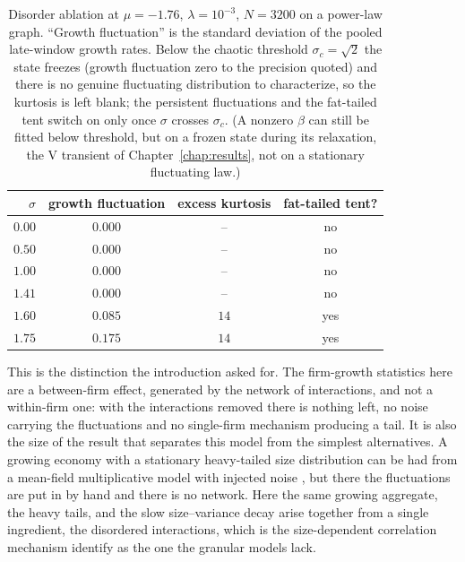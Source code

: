 \begin{table}[h]
    \centering
    \begin{tabular}{rccc}
        \hline
        $\sigma$ & growth fluctuation & excess kurtosis & fat-tailed tent? \\
        \hline
        $0.00$ & $0.000$ & --   & no  \\
        $0.50$ & $0.000$ & --   & no  \\
        $1.00$ & $0.000$ & --   & no  \\
        $1.41$ & $0.000$ & --   & no  \\
        $1.60$ & $0.085$ & $14$ & yes \\
        $1.75$ & $0.175$ & $14$ & yes \\
        \hline
    \end{tabular}
    \caption{Disorder ablation at $\mu = -1.76$, $\lambda = 10^{-3}$, $N = 3200$ on a
    power-law graph. ``Growth fluctuation'' is the standard deviation of the pooled
    late-window growth rates. Below the chaotic threshold $\sigma_c = \sqrt{2}$ the state
    freezes (growth fluctuation zero to the precision quoted) and there is no genuine
    fluctuating distribution to characterize, so the kurtosis is left blank; the
    persistent fluctuations and the fat-tailed tent switch on only once $\sigma$ crosses
    $\sigma_c$. (A nonzero $\beta$ can still be fitted below threshold, but on a frozen
    state during its relaxation, the V transient of Chapter~\ref{chap:results}, not on a
    stationary fluctuating law.)}
    \label{tab:growing-ablation}
\end{table}

This is the distinction the introduction asked for. The firm-growth statistics here are
a between-firm effect, generated by the network of interactions, and not a within-firm
one: with the interactions removed there is nothing left, no noise carrying the
fluctuations and no single-firm mechanism producing a tail. It is also the size of the
result that separates this model from the simplest alternatives. A growing economy with
a stationary heavy-tailed size distribution can be had from a mean-field multiplicative
model with injected noise \citep{bouchaudmezard2000}, but there the fluctuations are put
in by hand and there is no network. Here the same growing aggregate, the heavy tails,
and the slow size--variance decay arise together from a single ingredient, the disordered
interactions, which is the size-dependent correlation mechanism \citet{moran2024}
identify as the one the granular models lack.

